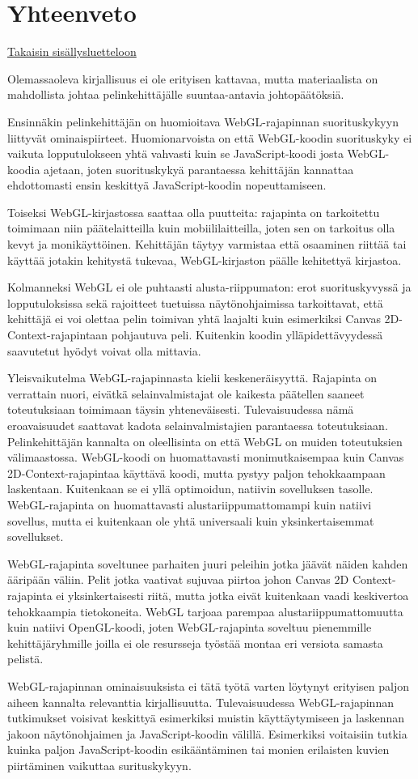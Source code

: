 \section{Yhteenveto}
\label{sec:johtopaatokset}
\hyperlink{index}{Takaisin sisällysluetteloon}

Olemassaoleva kirjallisuus ei ole erityisen kattavaa, mutta materiaalista on mahdollista johtaa pelinkehittäjälle suuntaa-antavia johtopäätöksiä.

Ensinnäkin pelinkehittäjän on huomioitava WebGL-rajapinnan suorituskykyyn liittyvät ominaispiirteet. Huomionarvoista on että WebGL-koodin suorituskyky ei vaikuta lopputulokseen yhtä vahvasti kuin se JavaScript-koodi josta WebGL-koodia ajetaan, joten suorituskykyä parantaessa kehittäjän kannattaa ehdottomasti ensin keskittyä JavaScript-koodin nopeuttamiseen. 

Toiseksi WebGL-kirjastossa saattaa olla puutteita: rajapinta on tarkoitettu toimimaan niin päätelaitteilla kuin mobiililaitteilla, joten sen on tarkoitus olla kevyt ja monikäyttöinen. Kehittäjän täytyy varmistaa että osaaminen riittää tai käyttää jotakin kehitystä tukevaa, WebGL-kirjaston päälle kehitettyä kirjastoa.

Kolmanneksi WebGL ei ole puhtaasti alusta-riippumaton: erot suorituskyvyssä ja lopputuloksissa sekä rajoitteet tuetuissa näytönohjaimissa tarkoittavat, että kehittäjä ei voi olettaa pelin toimivan yhtä laajalti kuin esimerkiksi Canvas 2D-Context-rajapintaan pohjautuva peli. Kuitenkin koodin ylläpidettävyydessä saavutetut hyödyt voivat olla mittavia.

Yleisvaikutelma WebGL-rajapinnasta kielii keskeneräisyyttä. Rajapinta on verrattain nuori, eivätkä selainvalmistajat ole kaikesta päätellen saaneet toteutuksiaan toimimaan täysin yhteneväisesti. Tulevaisuudessa nämä eroavaisuudet saattavat kadota selainvalmistajien parantaessa toteutuksiaan. Pelinkehittäjän kannalta on oleellisinta on että WebGL on muiden toteutuksien välimaastossa. WebGL-koodi on huomattavasti monimutkaisempaa kuin Canvas 2D-Context-rajapintaa käyttävä koodi, mutta pystyy paljon tehokkaampaan laskentaan. Kuitenkaan se ei yllä optimoidun, natiivin sovelluksen tasolle. WebGL-rajapinta on huomattavasti alustariippumattomampi kuin natiivi sovellus, mutta ei kuitenkaan ole yhtä universaali kuin yksinkertaisemmat sovellukset. 

WebGL-rajapinta soveltunee parhaiten juuri peleihin jotka jäävät näiden kahden ääripään väliin. Pelit jotka vaativat sujuvaa piirtoa johon Canvas 2D Context-rajapinta ei yksinkertaisesti riitä, mutta jotka eivät kuitenkaan vaadi keskivertoa tehokkaampia tietokoneita. WebGL tarjoaa parempaa alustariippumattomuutta kuin natiivi OpenGL-koodi, joten WebGL-rajapinta soveltuu pienemmille kehittäjäryhmille joilla ei ole resursseja työstää montaa eri versiota samasta pelistä. 

WebGL-rajapinnan ominaisuuksista ei tätä työtä varten löytynyt erityisen paljon aiheen kannalta relevanttia kirjallisuutta. Tulevaisuudessa WebGL-rajapinnan tutkimukset voisivat keskittyä esimerkiksi muistin käyttäytymiseen ja laskennan jakoon näytönohjaimen ja JavaScript-koodin välillä. Esimerkiksi voitaisiin tutkia kuinka paljon JavaScript-koodin esikääntäminen tai monien erilaisten kuvien piirtäminen vaikuttaa surituskykyyn.